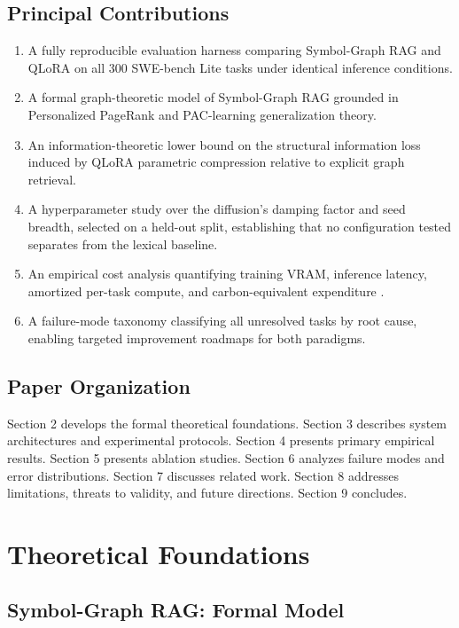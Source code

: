 \documentclass[10pt,twocolumn,letterpaper]{article}
\begin{document}
\subsection{Principal Contributions}


\begin{enumerate}
  \item A fully reproducible evaluation harness comparing Symbol-Graph RAG and QLoRA on all 300 SWE-bench Lite tasks under identical inference conditions.
  \item A formal graph-theoretic model of Symbol-Graph RAG grounded in Personalized PageRank and PAC-learning generalization theory.
  \item An information-theoretic lower bound on the structural information loss induced by QLoRA parametric compression relative to explicit graph retrieval.
  \item A hyperparameter study over the diffusion's damping factor and seed breadth, selected on a held-out split, establishing that no configuration tested separates from the lexical baseline.
  \item An empirical cost analysis quantifying training VRAM, inference latency, amortized per-task compute, and carbon-equivalent expenditure \cite{arxiv_2406_00584}.
  \item A failure-mode taxonomy classifying all unresolved tasks by root cause, enabling targeted improvement roadmaps for both paradigms.
\end{enumerate}


\subsection{Paper Organization}


Section 2 develops the formal theoretical foundations. Section 3 describes system architectures and experimental protocols. Section 4 presents primary empirical results. Section 5 presents ablation studies. Section 6 analyzes failure modes and error distributions. Section 7 discusses related work. Section 8 addresses limitations, threats to validity, and future directions. Section 9 concludes.




\section{Theoretical Foundations}



\subsection{Symbol-Graph RAG: Formal Model}
\end{document}
